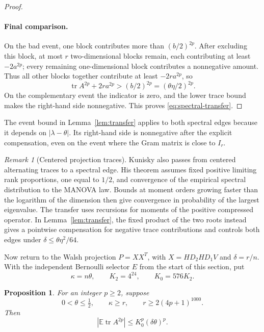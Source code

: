 \documentclass[11pt]{article}
\newtheorem{proposition}[theorem]{Proposition}
\theoremstyle{definition}
\theoremstyle{remark}
\newtheorem*{remark}{Remark}
\theoremstyle{plain}
\newcommand{\E}{\mathbb E}
\DeclareMathOperator{\tr}{tr}
\begin{document}
\begin{proof}
\paragraph{Final comparison.}
On the bad event, one block contributes more than \((b/2)^{2p}\).
After excluding this block, at most \(r\) two-dimensional blocks
remain, each contributing at least \(-2a^{2p}\); every remaining
one-dimensional block contributes a nonnegative amount.
Thus all other blocks together contribute at least \(-2ra^{2p}\),
so
\[
 \tr A^{2p}+2ra^{2p}>(b/2)^{2p}=(\theta\eta/2)^{2p}.
\]
On the complementary event the indicator is zero, and the lower
trace bound makes the right-hand side nonnegative.
This proves \eqref{eq:spectral-transfer}.
\end{proof}

The event bound in Lemma~\ref{lem:transfer} applies to both spectral
edges because it depends on $|\lambda-\theta|$. Its right-hand side
is nonnegative after the explicit compensation, even on the event
where the Gram matrix is close to $I_r$.

\begin{remark}[Centered projection traces]
Kunisky \cite[Theorem~1.12 and Sections~4--5]{kunisky_manova}
also passes from centered alternating traces to a spectral edge.
His theorem assumes fixed positive limiting rank proportions, one
equal to $1/2$, and convergence of the empirical spectral distribution
to the MANOVA law. Bounds at moment orders growing faster than the
logarithm of the dimension then give convergence in probability of the largest
eigenvalue. The transfer uses recursions for moments of the positive
compressed operator. In Lemma~\ref{lem:transfer}, the fixed product
of the two roots instead gives a pointwise compensation for negative
trace contributions and controls both edges under
$\delta\le\theta\eta^2/64$.
\end{remark}

Now return to the Walsh projection $P=XX^T$, with
$X=HD_2HD_1V$ and $\delta=r/n$. With the independent Bernoulli
selector $E$ from the start of this section, put
\[
 \kappa=n\theta,\qquad K_2=4^{24},\qquad K_0=576K_2.
\]
\begin{proposition}\label{prop:trace}
For an integer \(p\ge2\), suppose
\begin{equation}\label{eq:trace-hypotheses}
 0<\theta\le\tfrac12,\qquad \kappa\ge r,\qquad
                         r\ge2(4p+1)^{1000}.
\end{equation}
Then
\begin{equation}\label{eq:trace-bound}
                  \left|\E\tr A^{2p}\right|
                           \le K_0^p(\delta\theta)^p.
\end{equation}
\end{proposition}
\end{document}
